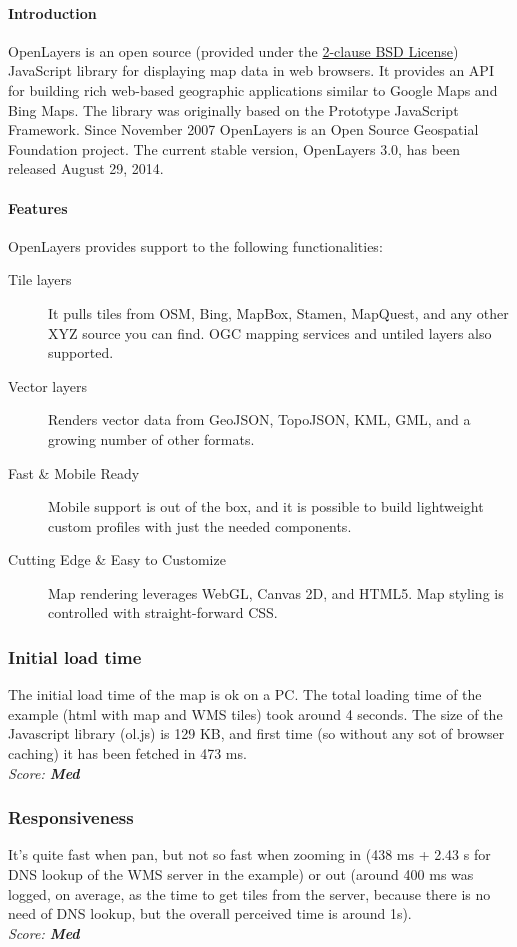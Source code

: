 \documentclass[11pt,a4paper,titlepage,oneside]{report}
\begin{document}
  \paragraph{Introduction} \indent
  OpenLayers is an open source (provided under the \href{'https://github.com/Leaflet/Leaflet/blob/master/LICENSE'}{2-clause BSD License}) JavaScript library for displaying map data in web browsers. It provides an API for building rich web-based geographic applications similar to Google Maps and Bing Maps. The library was originally based on the Prototype JavaScript Framework. Since November 2007 OpenLayers is an Open Source Geospatial Foundation project.
  The current stable version, OpenLayers 3.0, has been released August 29, 2014.

  \paragraph{Features}
  OpenLayers provides support to the following functionalities:

  \begin{description}
    \item[Tile layers] It pulls tiles from OSM, Bing, MapBox, Stamen, MapQuest, and any other XYZ source you can find. OGC mapping services and untiled layers also supported.
    \item[Vector layers] Renders vector data from GeoJSON, TopoJSON, KML, GML, and a growing number of other formats.
    \item[Fast \& Mobile Ready] Mobile support is out of the box, and it is possible to build lightweight custom profiles with just the needed components.
    \item[Cutting Edge \& Easy to Customize] Map rendering leverages WebGL, Canvas 2D, and HTML5. Map styling is controlled with straight-forward CSS.
  \end{description}

  \subsubsection{Initial load time}
  The initial load time of the map is ok on a PC. The total loading time of the example (html with map and WMS tiles) took around 4 seconds. The size of the Javascript library (ol.js) is 129 KB, and first time (so without any sot of browser caching) it has been fetched in 473 ms.
  \\ \emph{Score: \textbf{Med}}
  \subsubsection{Responsiveness}
  It's quite fast when pan, but not so fast when zooming in (438 ms + 2.43 s for DNS lookup of the WMS server in the example) or out (around 400 ms was logged, on average, as the time to get tiles from the server, because there is no need of DNS lookup, but the overall perceived time is around 1s).
  \\ \emph{Score: \textbf{Med}}
\end{document}
